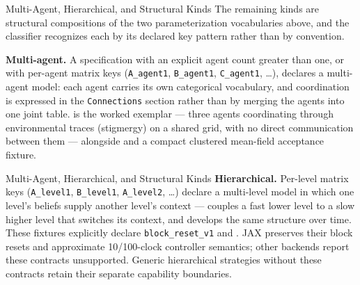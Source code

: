 \documentclass[
  ignorenonframetext,
]{beamer}
\begin{document}
\begin{frame}{Multi-Agent, Hierarchical, and
Structural Kinds}
\protect{}\label{sec:structural_variants}
The remaining kinds are structural compositions of the two
parameterization vocabularies above, and the classifier recognizes each
by its declared key pattern rather than by convention.

\textbf{Multi-agent.} A specification with an explicit agent count
greater than one, or with per-agent matrix keys (\texttt{A\_agent1},
\texttt{B\_agent1}, \texttt{C\_agent1}, \ldots), declares a multi-agent
model: each agent carries its own categorical vocabulary, and
coordination is expressed in the \texttt{Connections} section rather
than by merging the agents into one joint table.
 is the worked
exemplar --- three agents coordinating through environmental traces
(stigmergy) on a shared grid, with no direct communication between them
--- alongside  and a compact
clustered mean-field acceptance fixture.

\end{frame}

\begin{frame}{Multi-Agent, Hierarchical, and
Structural Kinds}
\textbf{Hierarchical.} Per-level matrix keys (\texttt{A\_level1},
\texttt{B\_level1}, \texttt{A\_level2}, \ldots) declare a multi-level
model in which one level's beliefs supply another level's context ---
 couples a
fast lower level to a slow higher level that switches its context, and
 develops the same structure over time.
These fixtures explicitly declare \texttt{block\_reset\_v1} and
. JAX preserves their block resets
and approximate 10/100-clock controller semantics; other backends report
these contracts unsupported. Generic hierarchical strategies without
these contracts retain their separate capability boundaries.

\end{frame}
\end{document}
